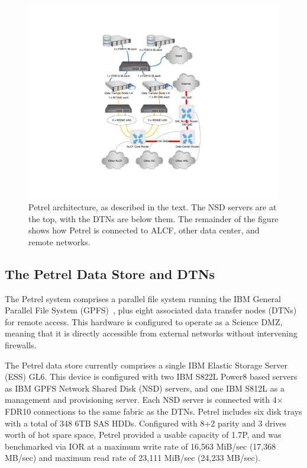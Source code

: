 \documentclass[sigconf]{acmart}
\begin{document}
\begin{figure}
\centering
\includegraphics[trim=3.2in 1.3in 3.4in 1.3in,clip,width=\columnwidth]{Figures/PetrelSystemDiagramNarrowG.pdf}

\vspace{-1ex}

\caption{Petrel architecture, as described in the text. The NSD servers are at the top,
with the DTNs are below them. The remainder of the figure shows how Petrel is connected to
ALCF, other data center, and remote networks. \label{fig:arch}}
\end{figure}


\subsection{The Petrel Data Store and DTNs}

The Petrel system comprises a parallel file system running the
IBM General Parallel File System (GPFS)~\cite{schmuck2002gpfs},
plus eight associated data transfer nodes (DTNs)~\cite{dart2014science} for remote access. 
This hardware is configured to operate as a Science DMZ, 
meaning that it is directly accessible from external networks without intervening firewalls.


The Petrel data store currently comprises  a single IBM Elastic Storage Server (ESS) GL6.
This device is configured with two IBM S822L Power8 based servers as IBM GPFS Network Shared Disk (NSD) servers, and one IBM S812L as a management and provisioning server. 
Each NSD server is connected with 4$\times$FDR10 connections to the same fabric as the DTNs. 
Petrel includes six disk trays with a total of 348 6TB SAS HDDs. 
Configured with 8+2 parity and 3 drives worth of hot spare space, Petrel provided a usable capacity of 1.7P, and was benchmarked via IOR at a maximum write rate of 16,563 MiB/sec (17,368 MB/sec) and maximum read rate of  23,111 MiB/sec (24,233 MB/sec).
\end{document}
